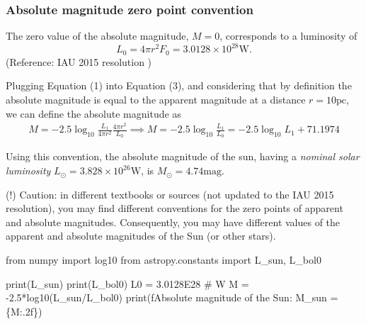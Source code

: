 \documentclass[
  letterpaper,
  DIV=11,
  numbers=noendperiod]{scrreprt}
\newenvironment{Shaded}{\begin{snugshade}}{\end{snugshade}}
\newcommand{\BuiltInTok}[1]{\textcolor[rgb]{0.00,0.23,0.31}{#1}}
\newcommand{\CommentTok}[1]{\textcolor[rgb]{0.37,0.37,0.37}{#1}}
\newcommand{\FloatTok}[1]{\textcolor[rgb]{0.68,0.00,0.00}{#1}}
\newcommand{\ImportTok}[1]{\textcolor[rgb]{0.00,0.46,0.62}{#1}}
\newcommand{\NormalTok}[1]{\textcolor[rgb]{0.00,0.23,0.31}{#1}}
\newcommand{\OperatorTok}[1]{\textcolor[rgb]{0.37,0.37,0.37}{#1}}
\newcommand{\SpecialCharTok}[1]{\textcolor[rgb]{0.37,0.37,0.37}{#1}}
\newcommand{\SpecialStringTok}[1]{\textcolor[rgb]{0.13,0.47,0.30}{#1}}
\begin{document}
\hypertarget{absolute-magnitude-zero-point-convention}{%
\subsubsection{Absolute magnitude zero point
convention}\label{absolute-magnitude-zero-point-convention}}

The zero value of the absolute magnitude, \(M=0\), corresponds to a
luminosity of
\[ L_0 = 4\pi r^2 F_0 = 3.0128 \times 10^{28} \mathrm{W}.\] (Reference:
IAU 2015 resolution )

Plugging Equation (1) into Equation (3), and considering that by
definition the absolute magnitude is equal to the apparent magnitude at
a distance \(r=10\mathrm{pc}\), we can define the absolute magnitude as
\begin{align}
M = -2.5\log_{10}{\frac{L_1}{4\pi r^2}\frac{4 \pi r^2}{L_0}} \implies M = -2.5 \log_{10}{\frac{L_1}{L_0}} = -2.5\log_{10} L_1 + 71.1974
\end{align}

Using this convention, the absolute magnitude of the sun, having a
\emph{nominal solar luminosity}
\(L_\odot = 3.828 \times 10^{26} \mathrm{W}\), is
\(M_\odot = 4.74\mathrm{mag}.\)

(!) Caution: in different textbooks or sources (not updated to the IAU
2015 resolution), you may find different conventions for the zero points
of apparent and absolute magnitudes. Consequently, you may have
different values of the apparent and absolute magnitudes of the Sun (or
other stars).

\begin{Shaded}
\begin{Highlighting}[]
\ImportTok{from}\NormalTok{ numpy }\ImportTok{import}\NormalTok{ log10}
\ImportTok{from}\NormalTok{ astropy.constants }\ImportTok{import}\NormalTok{ L\_sun, L\_bol0}

\BuiltInTok{print}\NormalTok{(L\_sun)}
\BuiltInTok{print}\NormalTok{(L\_bol0)}
\NormalTok{L0 }\OperatorTok{=} \FloatTok{3.0128E28} \CommentTok{\# W}
\NormalTok{M }\OperatorTok{=} \OperatorTok{{-}}\FloatTok{2.5}\OperatorTok{*}\NormalTok{log10(L\_sun}\OperatorTok{/}\NormalTok{L\_bol0)}
\BuiltInTok{print}\NormalTok{(}\SpecialStringTok{f\textquotesingle{}Absolute magnitude of the Sun: M\_sun = }\SpecialCharTok{\{}\NormalTok{M}\SpecialCharTok{:.2f\}}\SpecialStringTok{\textquotesingle{}}\NormalTok{)}
\end{Highlighting}
\end{Shaded}
\end{document}
